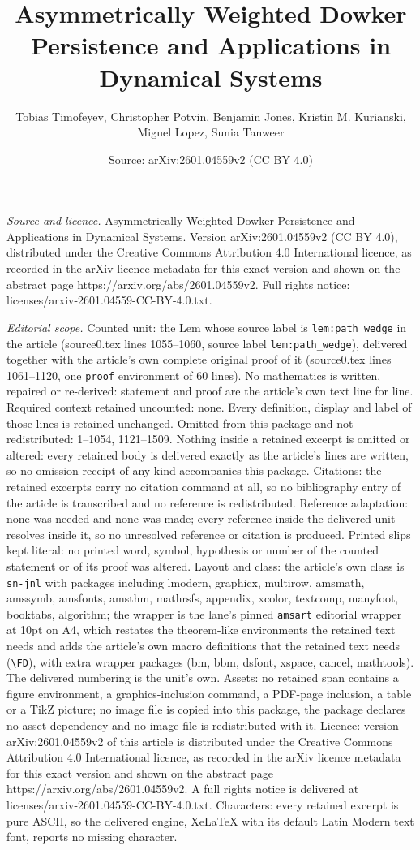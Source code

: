 \documentclass[10pt,a4paper]{amsart}
\title[Asymmetrically Weighted Dowker Persistence and Applications ]{Asymmetrically Weighted Dowker Persistence and Applications in Dynamical Systems}
\author{Tobias Timofeyev, Christopher Potvin, Benjamin Jones, Kristin M. Kurianski, Miguel Lopez, Sunia Tanweer}
\date{Source: arXiv:2601.04559v2 (CC BY 4.0)}
\begin{document}
\maketitle

\noindent\emph{Source and licence.} Asymmetrically Weighted Dowker Persistence and Applications in Dynamical Systems. Version arXiv:2601.04559v2 (CC BY 4.0), distributed under the Creative Commons Attribution 4.0 International licence, as recorded in the arXiv licence metadata for this exact version and shown on the abstract page https://arxiv.org/abs/2601.04559v2. Full rights notice: licenses/arxiv-2601.04559-CC-BY-4.0.txt.\par\smallskip

\noindent\textit{Editorial scope.} Counted unit: the Lem whose source label is \texttt{lem:path\_wedge} in the article (source0.tex lines 1055--1060, source label \texttt{lem:path\_wedge}), delivered together with the article's own complete original proof of it (source0.tex lines 1061--1120, one \texttt{proof} environment of 60 lines). No mathematics is written, repaired or re-derived: statement and proof are the article's own text line for line. Required context retained uncounted: none. Every definition, display and label of those lines is retained unchanged. Omitted from this package and not redistributed: 1--1054, 1121--1509. Nothing inside a retained excerpt is omitted or altered: every retained body is delivered exactly as the article's lines are written, so no omission receipt of any kind accompanies this package. Citations: the retained excerpts carry no citation command at all, so no bibliography entry of the article is transcribed and no reference is redistributed. Reference adaptation: none was needed and none was made; every reference inside the delivered unit resolves inside it, so no unresolved reference or citation is produced. Printed slips kept literal: no printed word, symbol, hypothesis or number of the counted statement or of its proof was altered. Layout and class: the article's own class is \texttt{sn-jnl} with packages including lmodern, graphicx, multirow, amsmath, amssymb, amsfonts, amsthm, mathrsfs, appendix, xcolor, textcomp, manyfoot, booktabs, algorithm; the wrapper is the lane's pinned \texttt{amsart} editorial wrapper at 10pt on A4, which restates the theorem-like environments the retained text needs and adds the article's own macro definitions that the retained text needs (\texttt{\textbackslash FD}), with extra wrapper packages (bm, bbm, dsfont, xspace, cancel, mathtools). The delivered numbering is the unit's own. Assets: no retained span contains a figure environment, a graphics-inclusion command, a PDF-page inclusion, a table or a TikZ picture; no image file is copied into this package, the package declares no asset dependency and no image file is redistributed with it. Licence: version arXiv:2601.04559v2 of this article is distributed under the Creative Commons Attribution 4.0 International licence, as recorded in the arXiv licence metadata for this exact version and shown on the abstract page https://arxiv.org/abs/2601.04559v2. A full rights notice is delivered at licenses/arxiv-2601.04559-CC-BY-4.0.txt. Characters: every retained excerpt is pure ASCII, so the delivered engine, XeLaTeX with its default Latin Modern text font, reports no missing character.
\end{document}
